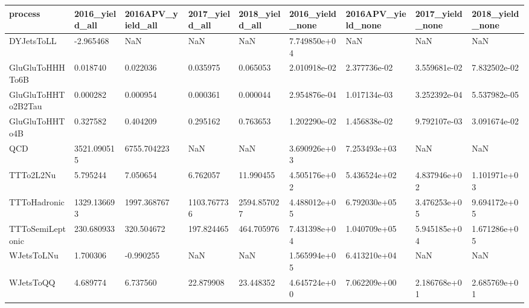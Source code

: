 \begin{tabular}{lllllllll}
\toprule
           process & 2016\_yield\_all & 2016APV\_yield\_all & 2017\_yield\_all & 2018\_yield\_all & 2016\_yield\_none & 2016APV\_yield\_none & 2017\_yield\_none & 2018\_yield\_none \\
\midrule
        DYJetsToLL &      -2.965468 &               NaN &            NaN &            NaN &    7.749850e+04 &                NaN &             NaN &             NaN \\
   GluGluToHHHTo6B &       0.018740 &          0.022036 &       0.035975 &       0.065053 &    2.010918e-02 &       2.377736e-02 &    3.559681e-02 &    7.832502e-02 \\
GluGluToHHTo2B2Tau &       0.000282 &          0.000954 &       0.000361 &       0.000044 &    2.954876e-04 &       1.017134e-03 &    3.252392e-04 &    5.537982e-05 \\
    GluGluToHHTo4B &       0.327582 &          0.404209 &       0.295162 &       0.763653 &    1.202290e-02 &       1.456838e-02 &    9.792107e-03 &    3.091674e-02 \\
               QCD &    3521.090515 &       6755.704223 &            NaN &            NaN &    3.690926e+03 &       7.253493e+03 &             NaN &             NaN \\
         TTTo2L2Nu &       5.795244 &          7.050654 &       6.762057 &      11.990455 &    4.505176e+02 &       5.436524e+02 &    4.837946e+02 &    1.101971e+03 \\
      TTToHadronic &    1329.136693 &       1997.368767 &    1103.767736 &    2594.857027 &    4.488012e+05 &       6.792030e+05 &    3.476253e+05 &    9.694172e+05 \\
  TTToSemiLeptonic &     230.680933 &        320.504672 &     197.824465 &     464.705976 &    7.431398e+04 &       1.040709e+05 &    5.945185e+04 &    1.671286e+05 \\
        WJetsToLNu &       1.700306 &         -0.990255 &            NaN &            NaN &    1.565994e+05 &       6.413210e+04 &             NaN &             NaN \\
         WJetsToQQ &       4.689774 &          6.737560 &      22.879908 &      23.448352 &    4.645724e+00 &       7.062209e+00 &    2.186768e+01 &    2.685769e+01 \\
\bottomrule
\end{tabular}

